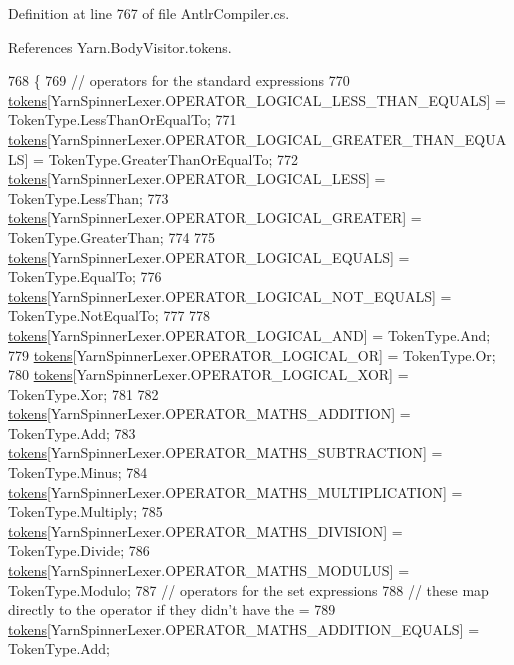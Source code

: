 Definition at line 767 of file Antlr\-Compiler.\-cs.



References Yarn.\-Body\-Visitor.\-tokens.


\begin{DoxyCode}
768         \{
769             \textcolor{comment}{// operators for the standard expressions}
770             \hyperlink{a00044_ab8aa4dbe47a807e3d973df2b85e3fffc}{tokens}[YarnSpinnerLexer.OPERATOR\_LOGICAL\_LESS\_THAN\_EQUALS] = TokenType.LessThanOrEqualTo;
771             \hyperlink{a00044_ab8aa4dbe47a807e3d973df2b85e3fffc}{tokens}[YarnSpinnerLexer.OPERATOR\_LOGICAL\_GREATER\_THAN\_EQUALS] = 
      TokenType.GreaterThanOrEqualTo;
772             \hyperlink{a00044_ab8aa4dbe47a807e3d973df2b85e3fffc}{tokens}[YarnSpinnerLexer.OPERATOR\_LOGICAL\_LESS] = TokenType.LessThan;
773             \hyperlink{a00044_ab8aa4dbe47a807e3d973df2b85e3fffc}{tokens}[YarnSpinnerLexer.OPERATOR\_LOGICAL\_GREATER] = TokenType.GreaterThan;
774 
775             \hyperlink{a00044_ab8aa4dbe47a807e3d973df2b85e3fffc}{tokens}[YarnSpinnerLexer.OPERATOR\_LOGICAL\_EQUALS] = TokenType.EqualTo;
776             \hyperlink{a00044_ab8aa4dbe47a807e3d973df2b85e3fffc}{tokens}[YarnSpinnerLexer.OPERATOR\_LOGICAL\_NOT\_EQUALS] = TokenType.NotEqualTo;
777 
778             \hyperlink{a00044_ab8aa4dbe47a807e3d973df2b85e3fffc}{tokens}[YarnSpinnerLexer.OPERATOR\_LOGICAL\_AND] = TokenType.And;
779             \hyperlink{a00044_ab8aa4dbe47a807e3d973df2b85e3fffc}{tokens}[YarnSpinnerLexer.OPERATOR\_LOGICAL\_OR] = TokenType.Or;
780             \hyperlink{a00044_ab8aa4dbe47a807e3d973df2b85e3fffc}{tokens}[YarnSpinnerLexer.OPERATOR\_LOGICAL\_XOR] = TokenType.Xor;
781 
782             \hyperlink{a00044_ab8aa4dbe47a807e3d973df2b85e3fffc}{tokens}[YarnSpinnerLexer.OPERATOR\_MATHS\_ADDITION] = TokenType.Add;
783             \hyperlink{a00044_ab8aa4dbe47a807e3d973df2b85e3fffc}{tokens}[YarnSpinnerLexer.OPERATOR\_MATHS\_SUBTRACTION] = TokenType.Minus;
784             \hyperlink{a00044_ab8aa4dbe47a807e3d973df2b85e3fffc}{tokens}[YarnSpinnerLexer.OPERATOR\_MATHS\_MULTIPLICATION] = TokenType.Multiply;
785             \hyperlink{a00044_ab8aa4dbe47a807e3d973df2b85e3fffc}{tokens}[YarnSpinnerLexer.OPERATOR\_MATHS\_DIVISION] = TokenType.Divide;
786             \hyperlink{a00044_ab8aa4dbe47a807e3d973df2b85e3fffc}{tokens}[YarnSpinnerLexer.OPERATOR\_MATHS\_MODULUS] = TokenType.Modulo;
787             \textcolor{comment}{// operators for the set expressions}
788             \textcolor{comment}{// these map directly to the operator if they didn't have the =}
789             \hyperlink{a00044_ab8aa4dbe47a807e3d973df2b85e3fffc}{tokens}[YarnSpinnerLexer.OPERATOR\_MATHS\_ADDITION\_EQUALS] = TokenType.Add;

\end{DoxyCode}
